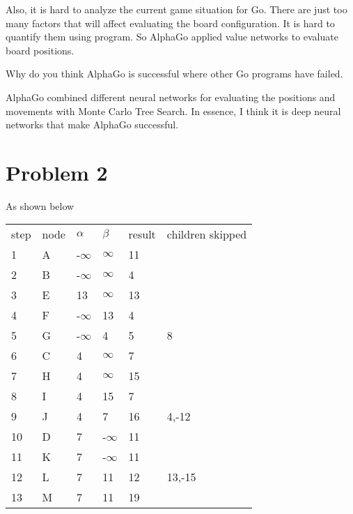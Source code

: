 \documentclass[11pt]{article}
\begin{document}
Also, it is hard to analyze the current game situation for Go. There are just too many factors that will affect evaluating the board configuration. It is hard to quantify them using program. So AlphaGo applied value networks to evaluate board positions. \newline

\noindent
Why do you think AlphaGo is successful where other Go programs have failed.  \newline

AlphaGo combined different neural networks for evaluating the positions and movements with Monte Carlo Tree Search. In essence, I think it is deep neural networks that make AlphaGo successful.\newline



\section*{Problem 2}

As shown below \newline


\begin{table}[!h]
\label{my-label}
\begin{tabular}{llllll}
step & node & $\alpha$  & $\beta$  & result & children skipped \\
1    & A    & -$\infty$ & $\infty$  & 11     &                  \\
2    & B    & -$\infty$ & $\infty$  & 4      &                  \\
3    & E    & 13 & $\infty$  & 13     &                  \\
4    & F    & -$\infty$& 13 & 4      &                  \\
5    & G    & -$\infty$ & 4  & 5      & 8                \\
6    & C    & 4  & $\infty$  & 7      &                  \\
7    & H    & 4  & $\infty$  & 15     &                  \\
8    & I    & 4  & 15 & 7      &                  \\
9    & J    & 4  & 7  & 16     & 4,-12            \\
10   & D    & 7  & -$\infty$ & 11     &                  \\
11   & K    & 7  & -$\infty$ & 11     &                  \\
12   & L    & 7  & 11 & 12     & 13,-15           \\
13   & M    & 7  & 11 & 19     &                 
\end{tabular}
\end{table}
\end{document}
